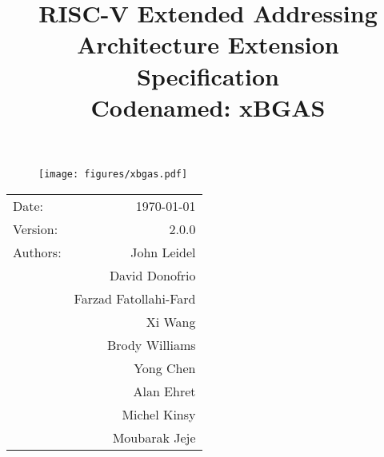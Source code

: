\documentclass{article}
\title{\textbf{RISC-V Extended Addressing\\Architecture Extension Specification\\Codenamed: xBGAS}} %
\date{} %
\begin{document}
\begin{figure}
\vspace{2in}
\begin{center}
\texttt{[image: figures/xbgas.pdf]} %
\end{center}
\end{figure}

\maketitle %

\thispagestyle{fancy}

\begin{center}
\begin{tabular}{l r}
Date: & \today \\
Version: & 2.0.0 \\ %
Authors: & John Leidel\\
& David Donofrio\\
& Farzad Fatollahi-Fard\\
& Xi Wang\\
& Brody Williams\\
& Yong Chen\\
& Alan Ehret\\
& Michel Kinsy\\
& Moubarak Jeje\\
\end{tabular}
\end{center}

\clearpage

\tableofcontents

\clearpage




\clearpage
\listoffigures
\listoftables
\clearpage
\end{document}

